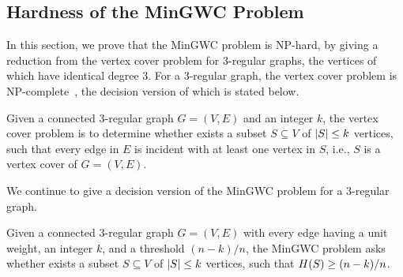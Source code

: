 \documentclass[10pt,twocolumn,twoside]{IEEEtran}
\begin{document}
\subsection{Hardness of the MinGWC Problem}

In this section, we prove that  the MinGWC problem is NP-hard, by giving a reduction from the vertex cover problem for 3-regular graphs, the vertices of which have identical degree 3. For a 3-regular graph, the vertex cover problem is NP-complete~\cite{FrHeJa98}, the decision version of which is stated below.
\begin{problem}\label{Cover3}
Given a connected 3-regular graph \(G=(V,E)\) and an integer \(k\),  the vertex cover problem is to determine whether exists a subset \(S\subseteq V\) of \(\left|S \right|\le k\) vertices, such that every edge in \(E\) is incident with at least one vertex in \(S\), i.e., \(S\) is a vertex cover of \(G=(V,E)\).
\end{problem}

We continue to give a decision version of  the MinGWC problem for a  3-regular graph.
\begin{problem}\label{MinGWC3}
Given a connected 3-regular graph \(G=(V,E)\) with every edge having a unit weight,  an integer \(k\), and a threshold $(n-k)/n$, the MinGWC problem  asks whether exists a subset \(S\subseteq V\) of \(\left|S \right|\le k\) vertices, such that \(H(S)\ge (n-k)/n\).
\end{problem}
\end{document}
